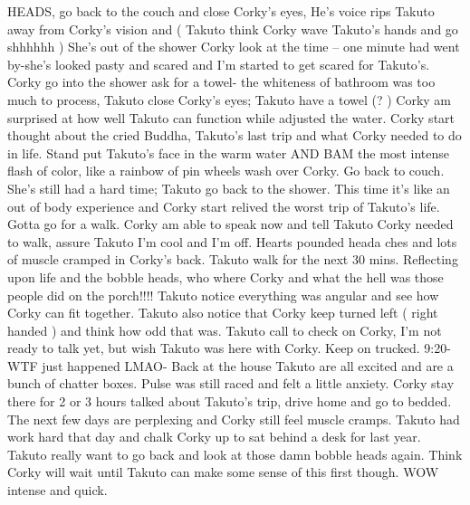 \documentclass[12pt]{book}
\begin{document}
HEADS, go back to the couch and close Corky's eyes, He's voice rips Takuto away from Corky's vision and ( Takuto think Corky wave Takuto's hands and go shhhhhh ) She's out of the shower Corky look at the time -- one minute had went by-she's looked pasty and scared and I'm started to get scared for Takuto's. Corky go into the shower ask for a towel- the whiteness of bathroom was too much to process, Takuto close Corky's eyes; Takuto have a towel (? ) Corky am surprised at how well Takuto can function while adjusted the water. Corky start thought about the cried Buddha, Takuto's last trip and what Corky needed to do in life. Stand put Takuto's face in the warm water AND BAM the most intense flash of color, like a rainbow of pin wheels wash over Corky. Go back to couch. She's still had a hard time; Takuto go back to the shower. This time it's like an out of body experience and Corky start relived the worst trip of Takuto's life. Gotta go for a walk. Corky am able to speak now and tell Takuto Corky needed to walk, assure Takuto I'm cool and I'm off. Hearts pounded heada ches and lots of muscle cramped in Corky's back. Takuto walk for the next 30 mins. Reflecting upon life and the bobble heads, who where Corky and what the hell was those people did on the porch!!!! Takuto notice everything was angular and see how Corky can fit together. Takuto also notice that Corky keep turned left ( right handed ) and think how odd that was. Takuto call to check on Corky, I'm not ready to talk yet, but wish Takuto was here with Corky. Keep on trucked. 9:20- WTF just happened LMAO- Back at the house Takuto are all excited and are a bunch of chatter boxes. Pulse was still raced and felt a little anxiety. Corky stay there for 2 or 3 hours talked about Takuto's trip, drive home and go to bedded. The next few days are perplexing and Corky still feel muscle cramps. Takuto had work hard that day and chalk Corky up to sat behind a desk for last year. Takuto really want to go back and look at those damn bobble heads again. Think Corky will wait until Takuto can make some sense of this first though. WOW intense and quick.
\end{document}
